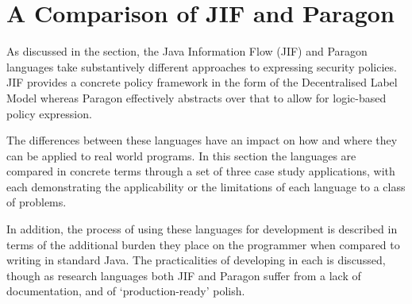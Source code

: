 \chapter{A Comparison of JIF and Paragon} \label{chap_comparison}

As discussed in the  section, the Java Information Flow (JIF) and Paragon languages take substantively different approaches to expressing security policies. JIF provides a concrete policy framework in the form of the Decentralised Label Model whereas Paragon effectively abstracts over that to allow for logic-based policy expression.

The differences between these languages have an impact on how and where they can be applied to real world programs. In this section the languages are compared in concrete terms through a set of three case study applications, with each demonstrating the applicability or the limitations of each language to a class of problems.

In addition, the process of using these languages for development is described in terms of the additional burden they place on the programmer when compared to writing in standard Java. The practicalities of developing in each is discussed, though as research languages both JIF and Paragon suffer from a lack of documentation, and of `production-ready' polish.

\newpage



\newpage



\newpage




%

\newpage


